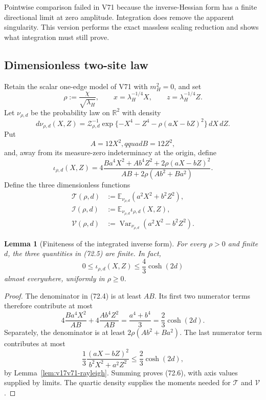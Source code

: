 \documentclass[11pt]{article}
\newtheorem{lemma}[theorem]{Lemma}
\theoremstyle{remark}
\begin{document}
Pointwise comparison failed in V71 because the inverse-Hessian form
has a finite directional limit at zero amplitude.  Integration does
remove the apparent singularity.  This version performs the exact
massless scaling reduction and shows what integration must still prove.

\subsection{Dimensionless two-site law}

Retain the scalar one-edge model of V71 with \(m_H^2=0\), and set
\[
 \rho:=\frac{\chi}{\sqrt{\lambda_H}},
 \qquad x=\lambda_H^{-1/4}X,
 \qquad z=\lambda_H^{-1/4}Z.                      \tag{72.1}
\]
Let \(\nu_{\rho,d}\) be the probability law on \(\mathbb R^2\) with
density
\[
 d\nu_{\rho,d}(X,Z)
 =\mathcal Z_{\rho,d}^{-1}
 \exp\{-X^4-Z^4-\rho(aX-bZ)^2\}\,dX\,dZ.         \tag{72.2}
\]
Put
\[
 A=12X^2,qquad B=12Z^2,                          \tag{72.3}
\]
and, away from its measure-zero indeterminacy at the origin, define
\[
 \iota_{\rho,d}(X,Z)
 =4\frac{
  Ba^4X^2+Ab^4Z^2+2\rho(aX-bZ)^2}
 {AB+2\rho(Ab^2+Ba^2)}.                          \tag{72.4}
\]
Define the three dimensionless functions
\[
\begin{aligned}
 \mathcal T(\rho,d)
 &:=\mathbb E_{\nu_{\rho,d}}(a^2X^2+b^2Z^2),\\
 \mathcal I(\rho,d)
 &:=\mathbb E_{\nu_{\rho,d}}\iota_{\rho,d}(X,Z),\\
 \mathcal V(\rho,d)
 &:=\operatorname{Var}_{\nu_{\rho,d}}
       (a^2X^2-b^2Z^2).                           \tag{72.5}
\end{aligned}
\]

\begin{lemma}[Finiteness of the integrated inverse form]
\label{lem:v17v72-finite}
For every \(\rho>0\) and finite \(d\), the three quantities in
(72.5) are finite.  In fact,
\[
 0\leq\iota_{\rho,d}(X,Z)
 \leq\frac43\cosh(2d)                              \tag{72.6}
\]
almost everywhere, uniformly in \(\rho\geq0\).
\end{lemma}

\begin{proof}
The denominator in (72.4) is at least \(AB\).  Its first two numerator
terms therefore contribute at most
\[
 4\frac{Ba^4X^2}{AB}+4\frac{Ab^4Z^2}{AB}
 =\frac{a^4+b^4}{3}=\frac23\cosh(2d).
\]
Separately, the denominator is at least
\(2\rho(Ab^2+Ba^2)\).  The last numerator term contributes at most
\[
 \frac13\frac{(aX-bZ)^2}{b^2X^2+a^2Z^2}
 \leq\frac23\cosh(2d),
\]
by Lemma~\ref{lem:v17v71-rayleigh}.  Summing proves (72.6), with axis
values supplied by limits.  The quartic density supplies the moments
needed for \(\mathcal T\) and \(\mathcal V\).
\end{proof}
\end{document}
